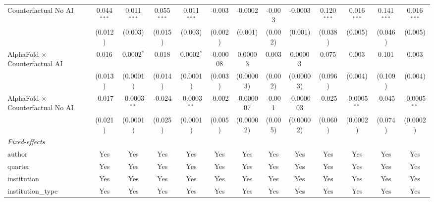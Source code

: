\begin{tabular}{lcccccccccccc}
   Counterfactual No AI                     & 0.044$^{***}$ & 0.011$^{***}$  & 0.055$^{***}$ & 0.011$^{***}$  & -0.003        & -0.0002       & -0.003        & -0.0003       & 0.120$^{***}$ & 0.016$^{***}$  & 0.141$^{***}$ & 0.016$^{***}$\\   
                                            & (0.012)       & (0.003)        & (0.015)       & (0.003)        & (0.002)       & (0.001)       & (0.002)       & (0.001)       & (0.038)       & (0.005)        & (0.046)       & (0.005)\\   
   AlphaFold $\times$ Counterfactual AI     & 0.016         & 0.0002$^{*}$   & 0.018         & 0.0002$^{*}$   & -0.00008      & 0.00003       & 0.003         & 0.00003       & 0.075         & 0.003          & 0.101         & 0.003\\   
                                            & (0.013)       & (0.0001)       & (0.014)       & (0.0001)       & (0.003)       & (0.00003)     & (0.002)       & (0.00003)     & (0.096)       & (0.004)        & (0.109)       & (0.004)\\   
   AlphaFold $\times$ Counterfactual No AI  & -0.017        & -0.0003$^{**}$ & -0.024        & -0.0003$^{**}$ & -0.002        & -0.000007     & -0.001        & -0.000003     & -0.025        & -0.0005$^{**}$ & -0.045        & -0.0005$^{**}$\\   
                                            & (0.021)       & (0.0001)       & (0.025)       & (0.0001)       & (0.005)       & (0.00002)     & (0.005)       & (0.00002)     & (0.060)       & (0.0002)       & (0.074)       & (0.0002)\\   
   \midrule
   \emph{Fixed-effects}\\
   author                                   & Yes           & Yes            & Yes           & Yes            & Yes           & Yes           & Yes           & Yes           & Yes           & Yes            & Yes           & Yes\\  
   quarter                                  & Yes           & Yes            & Yes           & Yes            & Yes           & Yes           & Yes           & Yes           & Yes           & Yes            & Yes           & Yes\\  
   institution                              & Yes           & Yes            & Yes           & Yes            & Yes           & Yes           & Yes           & Yes           & Yes           & Yes            & Yes           & Yes\\  
   institution\_type                        & Yes           & Yes            & Yes           & Yes            & Yes           & Yes           & Yes           & Yes           & Yes           & Yes            & Yes           & Yes\\  

\end{tabular}
